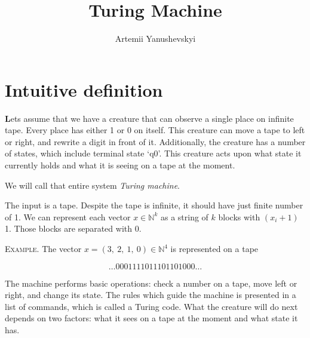 \documentclass[12pt]{article}
\title{Turing Machine}
\author{Artemii Yanushevskyi}
\date{}
\newcommand\tab[1][-1em]{\hspace*{#1}}
\begin{document}
\maketitle

\begin{addmargin}[3em]{3em}
\end{addmargin}

\section{Intuitive definition}
\textbf{\large L}ets assume that we have a creature that can observe a single place on infinite tape. Every place has either 1 or 0 on itself. This creature can move a tape to left or right, and rewrite a digit in front of it. Additionally, the creature has a number of states, which include terminal state `$\mathrm{q}0$'. This creature acts upon what state it currently holds and what it is seeing on a tape at the moment. 

We will call that entire system \emph{Turing machine}.

The input is a tape. Despite the tape is infinite, it should have just finite number of 1.
We can represent each vector $x\in\mathbb{N}^k$ as a string of $k$ blocks with $(x_i+1)$ 1. Those blocks are separated with 0. 

 \vspace{5mm}
\begin{addmargin}[3em]{3em}
\tab
\textsc{Example.} The vector $x=(3,\ 2,\ 1,\ 0)\in\mathbb{N}^4$ is represented on a tape

{\large $$\dots 0001111011101101000\dots$$}

\end{addmargin}

The machine performs basic operations: check a number on a tape, move left or right, and change its state. The rules which guide the machine is presented in a list of commands, which is called a Turing code. What the creature will do next depends on two factors: what it sees on a tape at the moment and what state it has.
 
\end{document}
